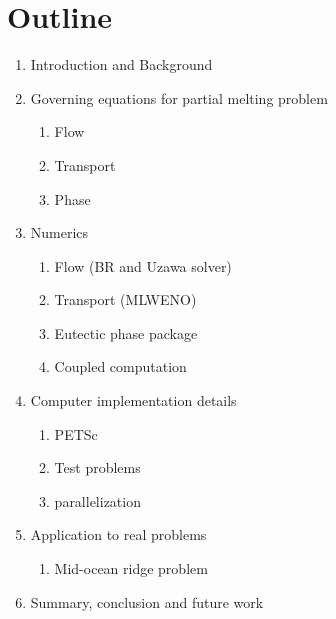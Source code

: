 \section{Outline}

\begin{enumerate}[I]
\item Introduction and Background
\item Governing equations for partial melting problem
\begin{enumerate}[i]
\item Flow
\item Transport
\item Phase
\end{enumerate}
\item Numerics
\begin{enumerate}[i]
\item Flow (BR and Uzawa solver)
\item Transport (MLWENO)
\item Eutectic phase package
\item Coupled computation
\end{enumerate}
\item Computer implementation details
\begin{enumerate}[i]
\item PETSc
\item Test problems
\item parallelization
\end{enumerate}
\item Application to real problems
\begin{enumerate}[i]
\item Mid-ocean ridge problem
\end{enumerate}
\item Summary, conclusion and future work
\end{enumerate}
